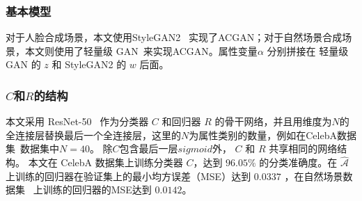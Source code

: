 \subsubsection{基本模型} 
对于人脸合成场景，本文使用StyleGAN2~\cite{stylegan2} 实现了ACGAN；对于自然场景合成场景，本文则使用了轻量级 GAN~\cite{lwgan}来实现ACGAN。属性变量$\alpha$ 分别拼接在 轻量级 GAN 的 $z$ 和 StyleGAN2 的 $w$ 后面。

\subsubsection{$C$和$R$的结构}
本文采用 ResNet-50~\cite{resnet} 作为分类器 $C$ 和回归器 $R$ 的骨干网络，并且用维度为$N$的全连接层替换最后一个全连接层，这里的$N$为属性类别的数量，例如在CelebA数据集~\cite{celeba}数据集中$N=40$。 除$C$包含最后一层$sigmoid$外， $C$ 和 $R$ 共享相同的网络结构。 本文在 CelebA 数据集上训练分类器 $C$，达到 $96.05\%$ 的分类准确度。在 $\hat{\mathcal{A}}$ 上训练的回归器在验证集上的最小均方误差（MSE）达到 $0.0337$ ，在自然场景数据集~\cite{scenedataset} 上训练的回归器的MSE达到 $0.0142$。

